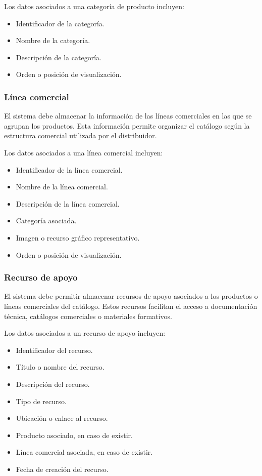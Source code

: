Los datos asociados a una categoría de producto incluyen:

\begin{itemize}
    \item Identificador de la categoría.
    \item Nombre de la categoría.
    \item Descripción de la categoría.
    \item Orden o posición de visualización.
\end{itemize}

\subsubsection*{Línea comercial}

El sistema debe almacenar la información de las líneas comerciales en las que se agrupan los productos. Esta información permite organizar el catálogo según la estructura comercial utilizada por el distribuidor.

Los datos asociados a una línea comercial incluyen:

\begin{itemize}
    \item Identificador de la línea comercial.
    \item Nombre de la línea comercial.
    \item Descripción de la línea comercial.
    \item Categoría asociada.
    \item Imagen o recurso gráfico representativo.
    \item Orden o posición de visualización.
\end{itemize}

\subsubsection*{Recurso de apoyo}

El sistema debe permitir almacenar recursos de apoyo asociados a los productos o líneas comerciales del catálogo. Estos recursos facilitan el acceso a documentación técnica, catálogos comerciales o materiales formativos.

Los datos asociados a un recurso de apoyo incluyen:

\begin{itemize}
    \item Identificador del recurso.
    \item Título o nombre del recurso.
    \item Descripción del recurso.
    \item Tipo de recurso.
    \item Ubicación o enlace al recurso.
    \item Producto asociado, en caso de existir.
    \item Línea comercial asociada, en caso de existir.
    \item Fecha de creación del recurso.
\end{itemize}

